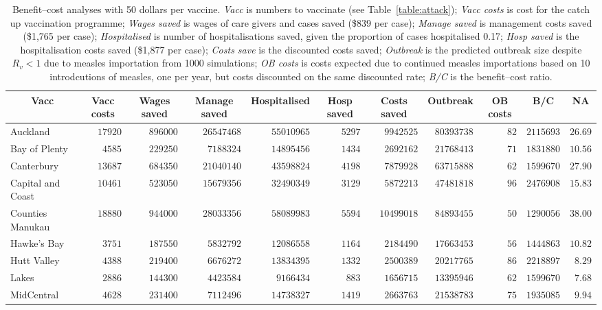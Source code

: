 \documentclass{article}
\begin{document}
\begin{table}\small
\caption{Benefit--cost analyses with 50 dollars per vaccine. \textit{Vacc} is numbers to vaccinate (see Table~\autoref{table:attack}); \textit{Vacc costs} is cost for the catch up vaccination programme; \textit{Wages saved} is wages of care givers and cases saved (\$839 per case); \textit{Manage saved} is management costs saved (\$1,765 per case); \textit{Hospitalised} is number of hospitalisations saved, given the proportion of cases hospitalised 0.17; \textit{Hosp saved} is the hospitalisation costs saved (\$1,877 per case); \textit{Costs save}  is the discounted costs saved; \textit{Outbreak}	is the predicted outbreak size despite $R_v < 1$ due to measles importation from 1000 simulations; \textit{OB costs}	is costs expected due to continued measles importations based on 10 introdcutions of measles, one per year, but costs discounted on the same discounted rate; \textit{B/C} is the benefit--cost ratio.}
\begin{center}
\begin{tabular}{lrrrrrrrrrr}
\hline\hline
\multicolumn{1}{c}{Vacc}&\multicolumn{1}{c}{Vacc costs}&\multicolumn{1}{c}{Wages saved}&\multicolumn{1}{c}{Manage saved}&\multicolumn{1}{c}{Hospitalised}&\multicolumn{1}{c}{Hosp saved}&\multicolumn{1}{c}{Costs saved}&\multicolumn{1}{c}{Outbreak}&\multicolumn{1}{c}{OB costs}&\multicolumn{1}{c}{B/C}&\multicolumn{1}{c}{NA}\tabularnewline
\hline
Auckland&$17920$&$896000$&$26547468$&$55010965$&$5297$&$ 9942525$&$80393738$&$ 82$&$2115693$&$26.69$\tabularnewline
Bay of Plenty&$ 4585$&$229250$&$ 7188324$&$14895456$&$1434$&$ 2692162$&$21768413$&$ 71$&$1831880$&$10.56$\tabularnewline
Canterbury&$13687$&$684350$&$21040140$&$43598824$&$4198$&$ 7879928$&$63715888$&$ 62$&$1599670$&$27.90$\tabularnewline
Capital and Coast&$10461$&$523050$&$15679356$&$32490349$&$3129$&$ 5872213$&$47481818$&$ 96$&$2476908$&$15.83$\tabularnewline
Counties Manukau&$18880$&$944000$&$28033356$&$58089983$&$5594$&$10499018$&$84893455$&$ 50$&$1290056$&$38.00$\tabularnewline
Hawke's Bay&$ 3751$&$187550$&$ 5832792$&$12086558$&$1164$&$ 2184490$&$17663453$&$ 56$&$1444863$&$10.82$\tabularnewline
Hutt Valley&$ 4388$&$219400$&$ 6676272$&$13834395$&$1332$&$ 2500389$&$20217765$&$ 86$&$2218897$&$ 8.29$\tabularnewline
Lakes&$ 2886$&$144300$&$ 4423584$&$ 9166434$&$ 883$&$ 1656715$&$13395946$&$ 62$&$1599670$&$ 7.68$\tabularnewline
MidCentral&$ 4628$&$231400$&$ 7112496$&$14738327$&$1419$&$ 2663763$&$21538783$&$ 75$&$1935085$&$ 9.94$\tabularnewline

\end{tabular}
\end{center}
\end{table}
\end{document}
